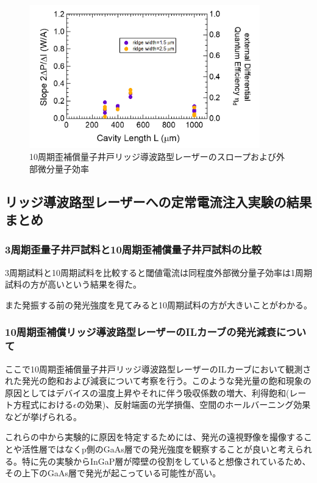 {\begin{figure}[ht]
	\centering
	\includegraphics[width=10cm]{figure/fig_3_2_10QW_ridge_slope.png}
		\caption{10周期歪補償量子井戸リッジ導波路型レーザーのスロープおよび外部微分量子効率}
		\label{fig:fig_3_2_10QW_ridge_slope}
\end{figure}

\subsection{リッジ導波路型レーザーへの定常電流注入実験の結果まとめ}
\subsubsection{3周期歪量子井戸試料と10周期歪補償量子井戸試料の比較}
3周期試料と10周期試料を比較すると閾値電流は同程度外部微分量子効率は1周期試料の方が高いという結果を得た。

また発振する前の発光強度を見てみると10周期試料の方が大きいことがわかる。
\subsubsection{10周期歪補償リッジ導波路型レーザーのILカーブの発光減衰について}
ここで10周期歪補償量子井戸リッジ導波路型レーザーのILカーブにおいて観測された発光の飽和および減衰について考察を行う。このような発光量の飽和現象の原因としてはデバイスの温度上昇やそれに伴う吸収係数の増大、利得飽和(レート方程式における$\epsilon$の効果)、反射端面の光学損傷、空間のホールバーニング効果などが挙げられる。

これらの中から実験的に原因を特定するためには、発光の遠視野像を撮像することや活性層ではなくp側のGaAs層での発光強度を観察することが良いと考えられる。特に先の実験からInGaP層が障壁の役割をしていると想像されているため、その上下のGaAs層で発光が起こっている可能性が高い。

}
